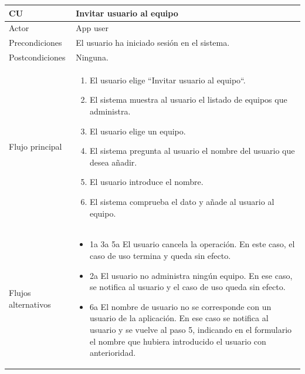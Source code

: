\documentclass[twoside]{report}
\newcommand\addrow[2]{#1 &#2\\ }
\newcommand\addheading[2]{#1 &#2\\ \hline}
\newcommand\tabularhead{\begin{tabular}{lp{0.7\textwidth}}
\hline
}
\newenvironment{usecase}{\tabularhead}
{\hline\end{tabular}}
\begin{document}
\begin{usecase}
  \addheading{\textbf{CU\arabic{usecase}}}{Invitar usuario al equipo} 
  \addrow{Actor}{App user}
  \addrow{Precondiciones}{El usuario ha iniciado sesión en el sistema.}
  \addrow{Postcondiciones}{Ninguna.}
  \addrow{Flujo principal}{
  		\begin{enumerate}
  		\item El usuario elige “Invitar usuario al equipo“. %
  		\item El sistema muestra al usuario el listado de equipos que administra. %
  		\item El usuario elige un equipo. %
  		\item El sistema pregunta al usuario el nombre del usuario que desea añadir. %
  		\item El usuario introduce el nombre. %
  		\item El sistema comprueba el dato y añade al usuario al equipo. %
  		\end{enumerate}
  }
  \addrow{Flujos alternativos}{
  		\begin{itemize}
  		\item 1a 3a 5a El usuario cancela la operación. En este caso, el caso de uso termina y queda sin efecto.
  		\item 2a El usuario no administra ningún equipo. En ese caso, se notifica al usuario y el caso de uso queda sin efecto.
  		\item 6a El nombre de usuario no se corresponde con un usuario de la aplicación. En ese caso se notifica al usuario y se vuelve al paso 5, indicando en el formulario el nombre que hubiera introducido el usuario con anterioridad.
  		\end{itemize}
  }
\end{usecase}\\

\vspace{0.5cm}
\end{document}
